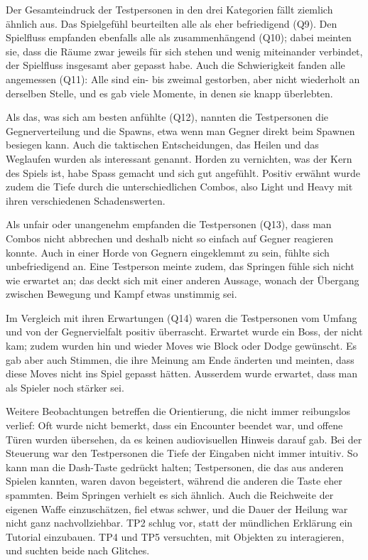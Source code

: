 \documentclass[../Main.tex]{subfiles}
\begin{document}
Der Gesamteindruck der Testpersonen in den drei Kategorien fällt ziemlich ähnlich aus. Das Spielgefühl beurteilten alle als eher befriedigend (Q9). Den Spielfluss empfanden ebenfalls alle als zusammenhängend (Q10); dabei meinten sie, dass die Räume zwar jeweils für sich stehen und wenig miteinander verbindet, der Spielfluss insgesamt aber gepasst habe. Auch die Schwierigkeit fanden alle angemessen (Q11): Alle sind ein- bis zweimal gestorben, aber nicht wiederholt an derselben Stelle, und es gab viele Momente, in denen sie knapp überlebten.

Als das, was sich am besten anfühlte (Q12), nannten die Testpersonen die Gegnerverteilung und die Spawns, etwa wenn man Gegner direkt beim Spawnen besiegen kann. Auch die taktischen Entscheidungen, das Heilen und das Weglaufen wurden als interessant genannt. Horden zu vernichten, was der Kern des Spiels ist, habe Spass gemacht und sich gut angefühlt. Positiv erwähnt wurde zudem die Tiefe durch die unterschiedlichen Combos, also Light und Heavy mit ihren verschiedenen Schadenswerten.

Als unfair oder unangenehm empfanden die Testpersonen (Q13), dass man Combos nicht abbrechen und deshalb nicht so einfach auf Gegner reagieren konnte. Auch in einer Horde von Gegnern eingeklemmt zu sein, fühlte sich unbefriedigend an. Eine Testperson meinte zudem, das Springen fühle sich nicht wie erwartet an; das deckt sich mit einer anderen Aussage, wonach der Übergang zwischen Bewegung und Kampf etwas unstimmig sei.

Im Vergleich mit ihren Erwartungen (Q14) waren die Testpersonen vom Umfang und von der Gegnervielfalt positiv überrascht. Erwartet wurde ein Boss, der nicht kam; zudem wurden hin und wieder Moves wie Block oder Dodge gewünscht. Es gab aber auch Stimmen, die ihre Meinung am Ende änderten und meinten, dass diese Moves nicht ins Spiel gepasst hätten. Ausserdem wurde erwartet, dass man als Spieler noch stärker sei.

Weitere Beobachtungen betreffen die Orientierung, die nicht immer reibungslos verlief: Oft wurde nicht bemerkt, dass ein Encounter beendet war, und offene Türen wurden übersehen, da es keinen audiovisuellen Hinweis darauf gab. Bei der Steuerung war den Testpersonen die Tiefe der Eingaben nicht immer intuitiv. So kann man die Dash-Taste gedrückt halten; Testpersonen, die das aus anderen Spielen kannten, waren davon begeistert, während die anderen die Taste eher spammten. Beim Springen verhielt es sich ähnlich. Auch die Reichweite der eigenen Waffe einzuschätzen, fiel etwas schwer, und die Dauer der Heilung war nicht ganz nachvollziehbar. TP2 schlug vor, statt der mündlichen Erklärung ein Tutorial einzubauen. TP4 und TP5 versuchten, mit Objekten zu interagieren, und suchten beide nach Glitches.
\end{document}
